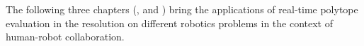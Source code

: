 
The following three chapters (,  and ) bring the applications of real-time polytope evaluation in the resolution on different robotics problems in the context of human-robot collaboration.


